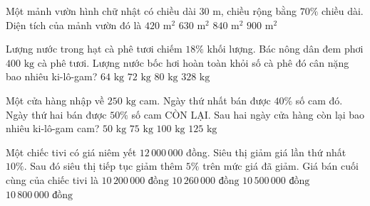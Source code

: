 \begin{ex} %
Một mảnh vườn hình chữ nhật có chiều dài $30\text{ m}$, chiều rộng bằng $70\%$ chiều dài. Diện tích của mảnh vườn đó là
\choice
{$420\text{ m}^2$}
{\True $630\text{ m}^2$}
{$840\text{ m}^2$}
{$900\text{ m}^2$}
\end{ex}

\begin{ex} %
Lượng nước trong hạt cà phê tươi chiếm $18\%$ khối lượng. Bác nông dân đem phơi $400\text{ kg}$ cà phê tươi. Lượng nước bốc hơi hoàn toàn khỏi số cà phê đó cân nặng bao nhiêu ki-lô-gam?
\choice
{$64\text{ kg}$}
{\True $72\text{ kg}$}
{$80\text{ kg}$}
{$328\text{ kg}$}
\end{ex}

\begin{ex} %
Một cửa hàng nhập về $250\text{ kg}$ cam. Ngày thứ nhất bán được $40\%$ số cam đó. Ngày thứ hai bán được $50\%$ số cam CÒN LẠI. Sau hai ngày cửa hàng còn lại bao nhiêu ki-lô-gam cam?
\choice
{$50\text{ kg}$}
{\True $75\text{ kg}$}
{$100\text{ kg}$}
{$125\text{ kg}$}
\end{ex}

\begin{ex} %
Một chiếc tivi có giá niêm yết $12\,000\,000$ đồng. Siêu thị giảm giá lần thứ nhất $10\%$. Sau đó siêu thị tiếp tục giảm thêm $5\%$ trên mức giá đã giảm. Giá bán cuối cùng của chiếc tivi là
\choice
{$10\,200\,000\text{ đồng}$}
{\True $10\,260\,000\text{ đồng}$}
{$10\,500\,000\text{ đồng}$}
{$10\,800\,000\text{ đồng}$}
\end{ex}

